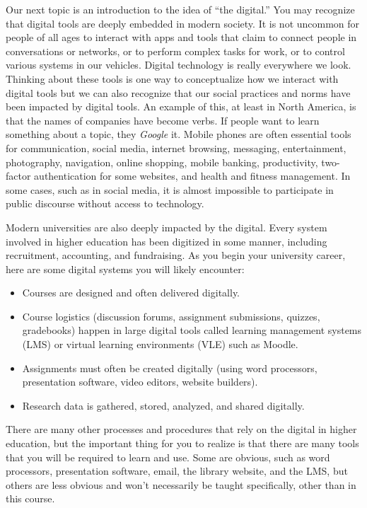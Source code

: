 \documentclass[
  letterpaper,
  DIV=11,
  numbers=noendperiod]{scrreprt}
\providecommand{\tightlist}{%
  \setlength{\itemsep}{0pt}\setlength{\parskip}{0pt}}\usepackage{longtable,booktabs,array}
\begin{document}
Our next topic is an introduction to the idea of ``the digital.'' You
may recognize that digital tools are deeply embedded in modern society.
It is not uncommon for people of all ages to interact with apps and
tools that claim to connect people in conversations or networks, or to
perform complex tasks for work, or to control various systems in our
vehicles. Digital technology is really everywhere we look. Thinking
about these tools is one way to conceptualize how we interact with
digital tools but we can also recognize that our social practices and
norms have been impacted by digital tools. An example of this, at least
in North America, is that the names of companies have become verbs. If
people want to learn something about a topic, they \emph{Google} it.
Mobile phones are often essential tools for communication, social media,
internet browsing, messaging, entertainment, photography, navigation,
online shopping, mobile banking, productivity, two-factor authentication
for some websites, and health and fitness management. In some cases,
such as in social media, it is almost impossible to participate in
public discourse without access to technology.

Modern universities are also deeply impacted by the digital. Every
system involved in higher education has been digitized in some manner,
including recruitment, accounting, and fundraising. As you begin your
university career, here are some digital systems you will likely
encounter:

\begin{itemize}
\tightlist
\item
  Courses are designed and often delivered digitally.
\item
  Course logistics (discussion forums, assignment submissions, quizzes,
  gradebooks) happen in large digital tools called learning management
  systems (LMS) or virtual learning environments (VLE) such as Moodle.
\item
  Assignments must often be created digitally (using word processors,
  presentation software, video editors, website builders).
\item
  Research data is gathered, stored, analyzed, and shared digitally.
\end{itemize}

There are many other processes and procedures that rely on the digital
in higher education, but the important thing for you to realize is that
there are many tools that you will be required to learn and use. Some
are obvious, such as word processors, presentation software, email, the
library website, and the LMS, but others are less obvious and won't
necessarily be taught specifically, other than in this course.
\end{document}
